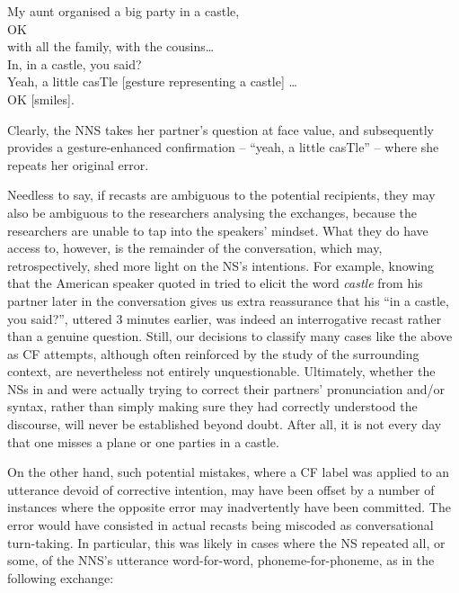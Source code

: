 \documentclass[output=paper,colorlinks,citecolor=brown,modfonts,nonflat]{../langscibook}
\begin{document}
\ea\label{ex:scheuer:9}
{\NNS} {My} {aunt} {organised} {a} {big} {party} {in} {a} {castle,}\\
{\NS} {OK}\\
{\NNS} {with} {all} {the} {family,} {with} {the} {cousins…}\\
{\NS} {In,} {in} {a} {castle,} {you} {said?}\\
{\NNS} {Yeah,} {a} {little} {casTle} [gesture representing a castle] {…}\\
{\NS} {OK} [smiles].
\z

Clearly, the NNS takes her partner’s question at face value, and subsequently provides a gesture-enhanced confirmation – “yeah, a little casTle” – where she repeats her original error. 



Needless to say, if recasts are ambiguous to the potential recipients, they may also be ambiguous to the researchers analysing the exchanges, because the researchers are unable to tap into the speakers’ mindset. What they do have access to, however, is the remainder of the conversation, which may, retrospectively, shed more light on the NS’s intentions. For example, knowing that the American speaker quoted in  tried to elicit the word \textit{castle} from his partner later in the conversation gives us extra reassurance that his “in a castle, you said?”, uttered 3 minutes earlier, was indeed an interrogative recast rather than a genuine question. Still, our decisions to classify many cases like the above as CF attempts, although often reinforced by the study of the surrounding context, are nevertheless not entirely unquestionable. Ultimately, whether the NSs in  and  were actually trying to correct their partners’ pronunciation and/or syntax, rather than simply making sure they had correctly understood the discourse, will never be established beyond doubt. After all, it is not every day that one misses a plane or one parties in a castle.



On the other hand, such potential mistakes, where a CF label was applied to an utterance devoid of corrective intention, may have been offset by a number of instances where the opposite error may inadvertently have been committed. The error would have consisted in actual recasts being miscoded as conversational turn-taking. In particular, this was likely in cases where the NS repeated all, or some, of the NNS’s utterance word-for-word, phoneme-for-phoneme, as in the following exchange:
\end{document}
